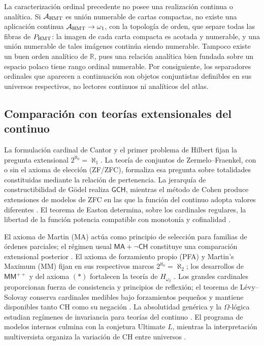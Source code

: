 La caracterización ordinal precedente no posee una realización continua o
analítica. Si \(\mathcal A_{\rm HMT}\) es unión numerable de cartas compactas,
no existe una aplicación continua
\(\mathcal A_{\rm HMT}\to\omega_1\), con la topología de orden, que separe
todas las fibras de \(P_{\rm HMT}\): la imagen de cada carta compacta es
acotada y numerable, y una unión numerable de tales imágenes continúa siendo
numerable. Tampoco existe un buen orden analítico de \(\mathbb R\), pues una
relación analítica bien fundada sobre un espacio polaco tiene rango ordinal
numerable. Por consiguiente, los separadores ordinales que aparecen a
continuación son objetos conjuntistas definibles en sus universos
respectivos, no lectores continuos ni analíticos del atlas.

\subsection{Comparación con teorías extensionales del continuo}

La formulación cardinal de Cantor y el primer problema de Hilbert fijan la
pregunta extensional \(2^{\aleph_0}=\aleph_1\). La teoría de conjuntos de
Zermelo--Fraenkel, con o sin el axioma de elección (ZF/ZFC), formaliza esa
pregunta sobre totalidades constituidas mediante la relación de pertenencia.
La jerarquía de constructibilidad de Gödel realiza \(\mathsf{GCH}\), mientras
el método de Cohen produce extensiones de modelos de ZFC en las que la función
del continuo adopta valores diferentes \cite{Godel1940,Cohen1963}. El teorema
de Easton determina, sobre los cardinales regulares, la libertad de la función
potencia compatible con monotonía y cofinalidad \cite{Easton1970}.

El axioma de Martin (MA) actúa como principio de selección para familias de
órdenes parciales; el régimen usual \(\mathsf{MA}+\neg\mathsf{CH}\) constituye
una comparación extensional posterior \cite{MartinSolovay1970}. El axioma de
forzamiento propio (PFA) y Martin's Maximum (MM) fijan en sus respectivos
marcos \(2^{\aleph_0}=\aleph_2\); los desarrollos de
\(\mathsf{MM}^{++}\) y del axioma \((*)\) fortalecen la teoría de
\(H_{\omega_2}\) \cite{Baumgartner1984,ForemanMagidorShelah1988,AsperoSchindler2021}.
Los grandes cardinales proporcionan fuerza de consistencia y principios de
reflexión; el teorema de Lévy--Solovay conserva cardinales medibles bajo
forzamientos pequeños y mantiene disponibles tanto CH como su negación
\cite{LevySolovay1967}. La absolutidad genérica y la \(\Omega\)-lógica
estudian regímenes de invariancia para teorías del continuo
\cite{Woodin2001}. El programa de modelos internos culmina con la conjetura
Ultimate \(L\), mientras la interpretación multiversista organiza la
variación de CH entre universos \cite{Woodin2010,Hamkins2012}.

